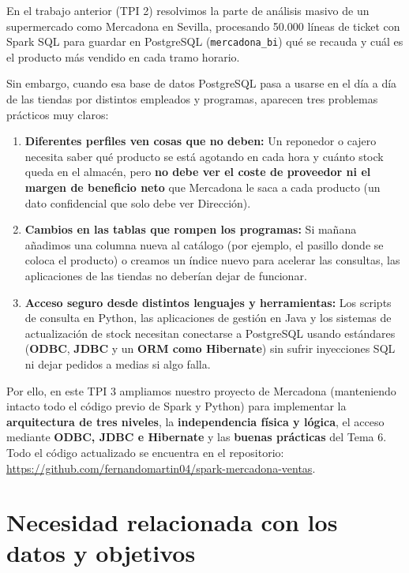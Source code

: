 \documentclass[a4paper,12pt]{article}
\newcommand{\RepoURL}{https://github.com/fernandomartin04/spark-mercadona-ventas}
\begin{document}
En el trabajo anterior (TPI 2) resolvimos la parte de análisis masivo de un supermercado como Mercadona en Sevilla, procesando 50.000 líneas de ticket con Spark SQL para guardar en PostgreSQL (\texttt{mercadona\_bi}) qué se recauda y cuál es el producto más vendido en cada tramo horario.

Sin embargo, cuando esa base de datos PostgreSQL pasa a usarse en el día a día de las tiendas por distintos empleados y programas, aparecen tres problemas prácticos muy claros:
\begin{enumerate}[leftmargin=1.0cm]
    \item \textbf{Diferentes perfiles ven cosas que no deben:} Un reponedor o cajero necesita saber qué producto se está agotando en cada hora y cuánto stock queda en el almacén, pero \textbf{no debe ver el coste de proveedor ni el margen de beneficio neto} que Mercadona le saca a cada producto (un dato confidencial que solo debe ver Dirección).
    \item \textbf{Cambios en las tablas que rompen los programas:} Si mañana añadimos una columna nueva al catálogo (por ejemplo, el pasillo donde se coloca el producto) o creamos un índice nuevo para acelerar las consultas, las aplicaciones de las tiendas no deberían dejar de funcionar.
    \item \textbf{Acceso seguro desde distintos lenguajes y herramientas:} Los scripts de consulta en Python, las aplicaciones de gestión en Java y los sistemas de actualización de stock necesitan conectarse a PostgreSQL usando estándares (\textbf{ODBC}, \textbf{JDBC} y un \textbf{ORM como Hibernate}) sin sufrir inyecciones SQL ni dejar pedidos a medias si algo falla.
\end{enumerate}

Por ello, en este TPI 3 ampliamos nuestro proyecto de Mercadona (manteniendo intacto todo el código previo de Spark y Python) para implementar la \textbf{arquitectura de tres niveles}, la \textbf{independencia física y lógica}, el acceso mediante \textbf{ODBC, JDBC e Hibernate} y las \textbf{buenas prácticas} del Tema 6. Todo el código actualizado se encuentra en el repositorio: \url{\RepoURL}.

\section{Necesidad relacionada con los datos y objetivos}
\end{document}
